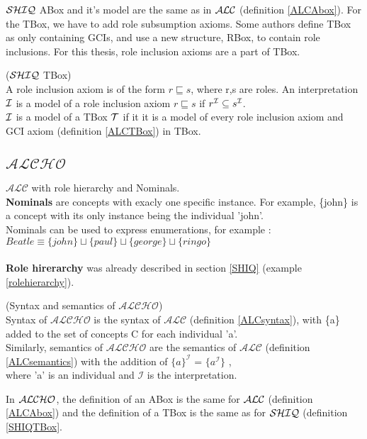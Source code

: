 $\mathcal{SHIQ}$ ABox and it's model are the same as in $\mathcal{ALC}$ (definition \ref{ALCAbox}). For the TBox, we have to add role subsumption axioms. 
Some authors define TBox as only containing GCIs, and use a new structure, RBox, to contain role inclusions. For this thesis, role inclusion axioms are a part of TBox.

\begin{mydef} \label{SHIQTBox} \cite{handbook} ($\mathcal{SHIQ}$ TBox) \\
A role inclusion axiom is of the form $r \sqsubseteq s$, where r,s
are roles. An interpretation $\mathcal{I}$ is a model of a role inclusion axiom  $r \sqsubseteq s$ if $r^{\mathcal{I}} \subseteq s^{\mathcal{I}}$.\\
$\mathcal{I}$ is a model of a TBox $\mathcal{T}$ if it it is a model of every role inclusion axiom and GCI axiom (definition \ref{ALCTBox}) in TBox.
\end{mydef}







\subsection{$\mathcal{ALCHO}$}
$\mathcal{ALC}$ with role hierarchy and Nominals.\\
\textbf{Nominals} are concepts with exacly one specific instance. For example, \{john\} is a concept with its only instance being the individual 'john'. \\
Nominals can be used to express enumerations, for example \cite{primer}: \\
   $Beatle \equiv \{john\} \sqcup  \{paul\} \sqcup  \{george\} \sqcup  \{ringo\} $\\
\\
\textbf{Role hirerarchy} was already described in section \ref{SHIQ} (example \ref{rolehierarchy}).
\begin{mydef} (Syntax and semantics of $\mathcal{ALCHO}$)\\
	Syntax of $\mathcal{ALCHO}$ is the syntax of $\mathcal{ALC}$ (definition \ref{ALCsyntax}), with \{a\} added to the set of concepts C for each individual 'a'.\\
	Similarly, semantics of $\mathcal{ALCHO}$ are the semantics of $\mathcal{ALC}$ (definition \ref{ALCsemantics}) with the addition of 
     $\{a\}^\mathcal{I}$ = $ \{ a^\mathcal{I} \} $ ,\\ 
     where 'a' is an individual and $ \mathcal{I}$ is the interpretation. \\
\end{mydef}
In $\mathcal{ALCHO}$, the definition of an ABox is the same for $\mathcal{ALC}$ (definition \ref{ALCAbox}) and the definition of a TBox is the same as for $\mathcal{SHIQ}$ (definition \ref{SHIQTBox}.
